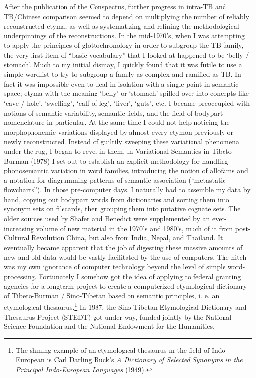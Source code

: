 After the publication of the Conspectus, further progress in intra-TB and TB/Chinese comparison seemed to depend on multiplying the number of reliably reconstructed etyma, as well as systematizing and refining the methodological underpinnings of the reconstructions. In the mid-1970's, when I was attempting to apply the principles of glottochronology in order to subgroup the TB family, the very first item of ``basic vocabulary'' that I looked at happened to be `belly / stomach'. Much to my initial dismay, I quickly found that it was futile to use a simple wordlist to try to subgroup a family as complex and ramified as TB. In fact it was impossible even to deal in isolation with a single point in semantic space; etyma with the meaning `belly' or `stomach' spilled over into concepts like `cave / hole', `swelling', `calf of leg', `liver', `guts', etc. I became preoccupied with notions of semantic variability, semantic fields, and the field of bodypart nomenclature in particular. At the same time I could not help noticing the morphophonemic variations displayed by almost every etymon previously or newly reconstructed. Instead of guiltily sweeping these variational phenomena under the rug, I began to revel in them. In Variational Semantics in Tibeto-Burman (1978) I set out to establish an explicit methodology for handling phonosemantic variation in word families, introducing the notion of allofams and a notation for diagramming patterns of semantic association (``metastatic flowcharts'').
In those pre-computer days, I naturally had to assemble my data by hand, copying out bodypart words from dictionaries and sorting them into synonym sets on filecards, then grouping them into putative cognate sets. The older sources used by Shafer and Benedict were supplemented by an ever-increasing volume of new material in the 1970's and 1980's, much of it from post-Cultural Revolution China, but also from India, Nepal, and Thailand. It eventually became apparent that the job of digesting these massive amounts of new and old data would be vastly facilitated by the use of computers.
The hitch was my own ignorance of computer technology beyond the level of simple word-processing. Fortunately I somehow got the idea of applying to federal granting agencies for a longterm project to create a computerized etymological dictionary of Tibeto-Burman / Sino-Tibetan based on semantic principles, i.
e. an etymological thesaurus.\footnote{The shining example of an etymological thesaurus in the field of Indo-European is Carl Darling Buck's {\it A Dictionary of Selected Synonyms in the Principal Indo-European Languages} (1949).} In 1987, the Sino-Tibetan Etymological Dictionary and Thesaurus Project (STEDT) got under way, funded jointly by the National Science Foundation and the National Endowment for the Humanities.
